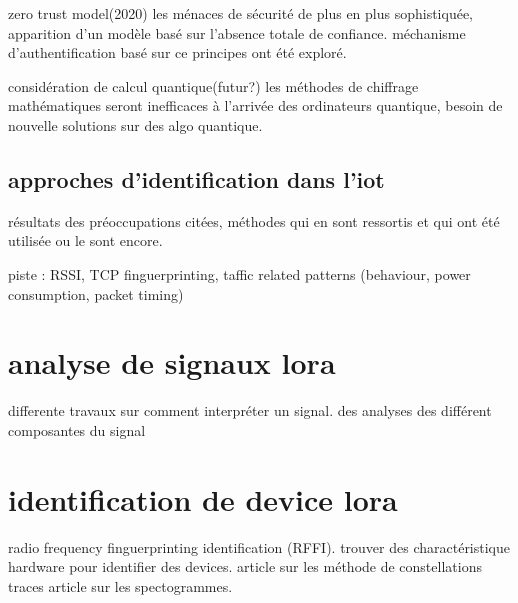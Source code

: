 zero trust model(2020) les ménaces de sécurité de plus en plus sophistiquée, apparition d'un modèle basé sur l'absence totale de confiance. méchanisme d'authentification basé sur ce principes ont été exploré.

considération de calcul quantique(futur?)
les méthodes de chiffrage mathématiques seront inefficaces à l'arrivée des ordinateurs quantique, besoin de nouvelle solutions sur des algo quantique.

\subsection{approches d'identification dans l'iot}

résultats des préoccupations citées, méthodes qui en sont ressortis et qui ont été utilisée ou le sont encore.

piste : RSSI, TCP finguerprinting, taffic related patterns (behaviour, power consumption, packet timing) 

\section{analyse de signaux lora}

differente travaux sur comment interpréter un signal. des analyses des différent composantes du signal 

\section{identification de device lora}

radio frequency finguerprinting identification (RFFI). trouver des charactéristique hardware pour identifier des devices.
article sur les méthode de constellations traces
article sur les spectogrammes.
